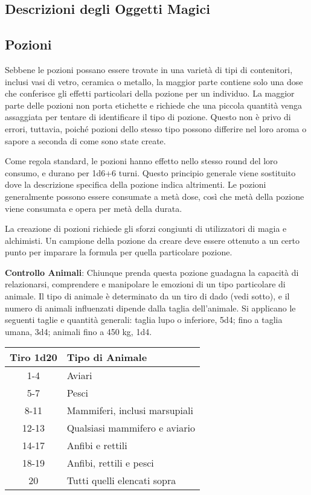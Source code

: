 \documentclass{article}
\begin{document}
\begin{multicols}{2}
\begin{table}[h]
\end{table}

\section{Descrizioni degli Oggetti Magici}

\subsection{Pozioni}

Sebbene le pozioni possano essere trovate in una varietà di tipi di contenitori, inclusi vasi di vetro, ceramica o metallo, la maggior parte contiene solo una dose che conferisce gli effetti particolari della pozione per un individuo. La maggior parte delle pozioni non porta etichette e richiede che una piccola quantità venga assaggiata per tentare di identificare il tipo di pozione. Questo non è privo di errori, tuttavia, poiché pozioni dello stesso tipo possono differire nel loro aroma o sapore a seconda di come sono state create.

Come regola standard, le pozioni hanno effetto nello stesso round del loro consumo, e durano per 1d6+6 turni. Questo principio generale viene sostituito dove la descrizione specifica della pozione indica altrimenti. Le pozioni generalmente possono essere consumate a metà dose, così che metà della pozione viene consumata e opera per metà della durata.

La creazione di pozioni richiede gli sforzi congiunti di utilizzatori di magia e alchimisti. Un campione della pozione da creare deve essere ottenuto a un certo punto per imparare la formula per quella particolare pozione.

\textbf{Controllo Animali}: Chiunque prenda questa pozione guadagna la capacità di relazionarsi, comprendere e manipolare le emozioni di un tipo particolare di animale. Il tipo di animale è determinato da un tiro di dado (vedi sotto), e il numero di animali influenzati dipende dalla taglia dell'animale. Si applicano le seguenti taglie e quantità generali: taglia lupo o inferiore, 5d4; fino a taglia umana, 3d4; animali fino a 450 kg, 1d4.

\begin{table}[h]
\centering
\begin{tabular}{|c|l|}
\hline
\textbf{Tiro 1d20} & \textbf{Tipo di Animale} \\
\hline
1-4 & Aviari \\
5-7 & Pesci \\
8-11 & Mammiferi, inclusi marsupiali \\
12-13 & Qualsiasi mammifero e aviario \\
14-17 & Anfibi e rettili \\
18-19 & Anfibi, rettili e pesci \\
20 & Tutti quelli elencati sopra \\
\hline
\end{tabular}


\end{table}
\end{multicols}
\end{document}
